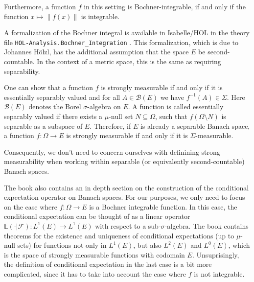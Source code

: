 Furthermore, a function $f$ in this setting is Bochner-integrable, if and only if the function $x \mapsto \lVert f(x) \rVert$ is integrable.

\vspace{0.3cm}
\relax
{}\relax

A formalization of the Bochner integral is available in Isabelle/HOL in the theory file \texttt{HOL-Analysis.Bochner\_Integration} \cite{hoelzl2011measuretheory}. This formalization, which is due to Johannes Hölzl, has the additional assumption that the space $E$ be second-countable. In the context of a metric space, this is the same as requiring separability.
\vspace{0.3cm}
\begin{remark}

One can show that a function $f$ is strongly measurable if and only if it is essentially separably valued and for all $A \in \mathcal{B}(E)$ we have $f^{-1}(A) \in \Sigma$. Here $\mathcal{B}(E)$ denotes the Borel $\sigma$-algebra on $E$. A function is called essentially separably valued if there exists a $\mu$-null set $N \subseteq \Omega$, such that $f (\Omega \setminus N)$ is separable as a subspace of $E$. Therefore, if $E$ is already a separable Banach space, a function $f : \Omega \rightarrow E$ is strongly measurable if and only if it is $\Sigma$-measurable.

Consequently, we don't need to concern ourselves with definining strong measurability when working within separable (or equivalently second-countable) Banach spaces.
\end{remark}
\vspace{0.3cm}

The book also contains an in depth section on the construction of the conditional expectation operator on Banach spaces. For our purposes, we only need to focus on the case where $f : \Omega \rightarrow E$ is a Bochner integrable function. In this case, the conditional expectation can be thought of as a linear operator $\mathbb{E}(\cdot\vert\mathcal{F}) : L^1(E) \rightarrow L^1(E)$ with respect to a sub-$\sigma$-algebra. The book contains theorems for the existence and uniqueness of conditional expectations (up to $\mu$-null sets) for functions not only in $L^1(E)$, but also $L^2(E)$ and $L^0(E)$, which is the space of strongly measurable functions with codomain $E$. Unsuprisingly, the definition of conditional expectation in the last case is a bit more complicated, since it has to take into account the case where $f$ is not integrable.

